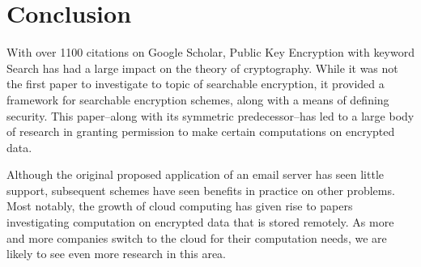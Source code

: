 \documentclass[a4paper,11pt]{article}
\begin{document}
    \section{Conclusion}

    With over 1100 citations on Google Scholar, Public Key Encryption with keyword Search has had a large impact on the theory of cryptography. While it was not the first paper to investigate to topic of searchable encryption, it provided a framework for searchable encryption schemes, along with a means of defining security. This paper--along with its symmetric predecessor--has led to a large body of research in granting permission to make certain computations on encrypted data.

    Although the original proposed application of an email server has seen little support, subsequent schemes have seen benefits in practice on other problems. Most notably, the growth of cloud computing has given rise to papers investigating computation on encrypted data that is stored remotely. As more and more companies switch to the cloud for their computation needs, we are likely to see even more research in this area.

    \printbibliography
\end{document}
